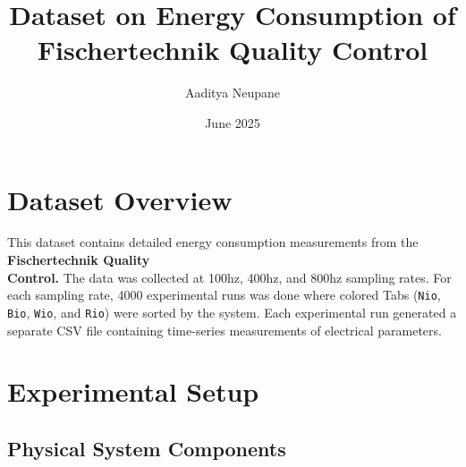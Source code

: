 \documentclass{article}
\title{Dataset on Energy Consumption of Fischertechnik Quality Control}
\author{Aaditya Neupane}
\date{June 2025}
\begin{document}
\maketitle

\section{Dataset Overview}

This dataset contains detailed energy consumption measurements from the \textbf{Fischertechnik Quality \\ Control.} The data was collected at 100hz, 400hz, and 800hz sampling rates. For each sampling rate, 4000 experimental runs was done where colored Tabs (\texttt{Nio}, \texttt{Bio}, \texttt{Wio}, and \texttt{Rio}) were sorted by the system. Each experimental run generated a separate CSV file containing time-series measurements of electrical parameters.

\section{Experimental Setup}

\subsection{Physical System Components}
\end{document}

